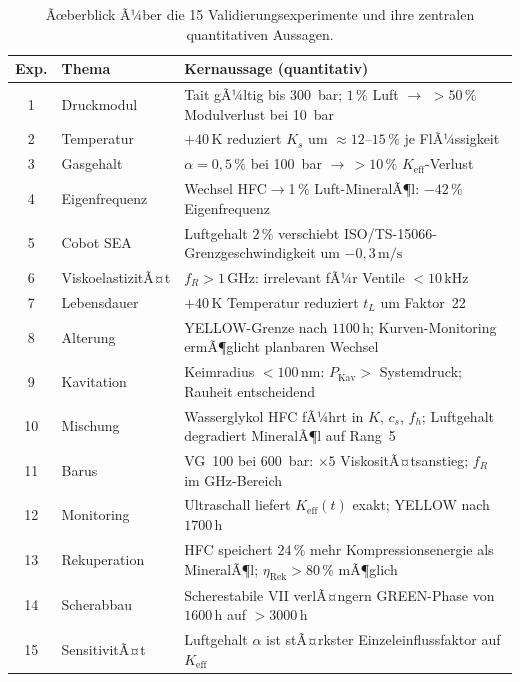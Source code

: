 ﻿\documentclass[a4paper,12pt]{scrreprt}
\theoremstyle{definition}
\begin{document}
\begin{table}[H]
  \centering
  \caption{Ãœberblick Ã¼ber die 15 Validierungsexperimente und ihre
           zentralen quantitativen Aussagen.}
  \label{tab:exp_summary}
  \small
  \begin{tabularx}{\textwidth}{c l X}
    \toprule
    \textbf{Exp.} & \textbf{Thema} & \textbf{Kernaussage (quantitativ)} \\
    \midrule
    1  & Druckmodul & Tait gÃ¼ltig bis 300~bar; $1\,\%$ Luft $\to$ $>50\,\%$ Modulverlust bei 10~bar \\
    2  & Temperatur & $+40\,\mathrm{K}$ reduziert $K_s$ um $\approx 12$--$15\,\%$ je FlÃ¼ssigkeit \\
    3  & Gasgehalt  & $\alpha = 0{,}5\,\%$ bei 100~bar $\to\,{>}10\,\%$ $K_{\mathrm{eff}}$-Verlust \\
    4  & Eigenfrequenz & Wechsel HFC$\to$1\,\% Luft-MineralÃ¶l: $-42\,\%$ Eigenfrequenz \\
    5  & Cobot SEA & Luftgehalt $2\,\%$ verschiebt ISO/TS-15066-Grenzgeschwindigkeit um $-0{,}3\,\mathrm{m/s}$ \\
    6  & ViskoelastizitÃ¤t & $f_R > 1\,\mathrm{GHz}$: irrelevant fÃ¼r Ventile $<10\,\mathrm{kHz}$ \\
    7  & Lebensdauer & $+40\,\mathrm{K}$ Temperatur reduziert $t_L$ um Faktor~22 \\
    8  & Alterung & YELLOW-Grenze nach $1100\,\mathrm{h}$; Kurven-Monitoring ermÃ¶glicht planbaren Wechsel \\
    9  & Kavitation & Keimradius $< 100\,\mathrm{nm}$: $P_{\mathrm{Kav}} >$ Systemdruck; Rauheit entscheidend \\
   10  & Mischung & Wasserglykol HFC fÃ¼hrt in $K$, $c_s$, $f_h$; Luftgehalt degradiert MineralÃ¶l auf Rang~5 \\
   11  & Barus & VG~100 bei 600~bar: $\times 5$ ViskositÃ¤tsanstieg; $f_R$ im GHz-Bereich \\
   12  & Monitoring & Ultraschall liefert $K_{\mathrm{eff}}(t)$ exakt; YELLOW nach $1700\,\mathrm{h}$ \\
   13  & Rekuperation & HFC speichert $24\,\%$ mehr Kompressionsenergie als MineralÃ¶l; $\eta_{\mathrm{Rek}} > 80\,\%$ mÃ¶glich \\
   14  & Scherabbau & Scherestabile VII verlÃ¤ngern GREEN-Phase von $1600\,\mathrm{h}$ auf $> 3000\,\mathrm{h}$ \\
   15  & SensitivitÃ¤t & Luftgehalt $\alpha$ ist stÃ¤rkster Einzeleinflussfaktor auf $K_{\mathrm{eff}}$ \\
    \bottomrule
  \end{tabularx}
\end{table}
\end{document}
